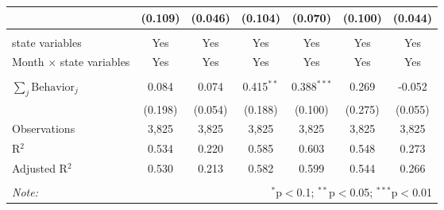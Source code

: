 \begin{tabular}{@{\extracolsep{1pt}}lcccccc}
  & (0.109) & (0.046) & (0.104) & (0.070) & (0.100) & (0.044) \\ 
 \hline \\[-1.8ex] 
state variables & Yes & Yes & Yes & Yes & Yes & Yes \\ 
Month $\times$ state variables & Yes & Yes & Yes & Yes & Yes & Yes \\ 
\hline \\[-1.8ex] 
$\sum_j \mathrm{Behavior}_j$ & 0.084 & 0.074 & 0.415$^{**}$ & 0.388$^{***}$ & 0.269 & -0.052 \\ 
 & (0.198) & (0.054) & (0.188) & (0.100) & (0.275) & (0.055) \\ 
Observations & 3,825 & 3,825 & 3,825 & 3,825 & 3,825 & 3,825 \\ 
R$^{2}$ & 0.534 & 0.220 & 0.585 & 0.603 & 0.548 & 0.273 \\ 
Adjusted R$^{2}$ & 0.530 & 0.213 & 0.582 & 0.599 & 0.544 & 0.266 \\ 
\hline 
\hline \\[-1.8ex] 
\textit{Note:}  & \multicolumn{6}{r}{$^{*}$p$<$0.1; $^{**}$p$<$0.05; $^{***}$p$<$0.01} \\ 
\end{tabular} 